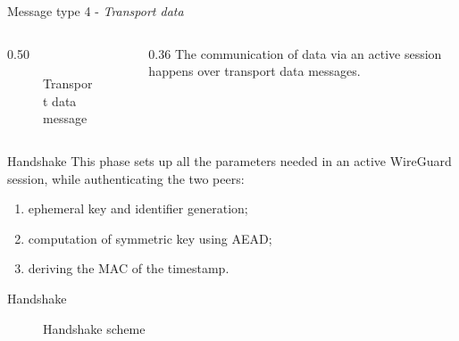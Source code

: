\documentclass[light]{presenta}
\begin{document}
\begin{frame}{Message type 4 - \textit{Transport data}}
  \begin{columns}
    \begin{column}{0.50\paperwidth}
      \begin{figure}[H]
        
        \caption{Transport data message}
      \end{figure}
    \end{column}
    \begin{column}{0.36\paperwidth}
      \justifying
      The communication of data via an active session happens over transport data messages.
    \end{column}
  \end{columns}
\end{frame}

\begin{frame}{Handshake}
  This phase sets up all the parameters needed in an active WireGuard session, while authenticating the two peers\pause:
  \begin{enumerate}
    \item ephemeral key and identifier generation;
    \pause
    \item computation of symmetric key using AEAD;
    \pause
    \item deriving the MAC of the timestamp.
  \end{enumerate}
\end{frame}

\begin{frame}{Handshake}
  \begin{figure}[H]
    
    \caption{Handshake scheme}
  \end{figure}
\end{frame}
\end{document}
